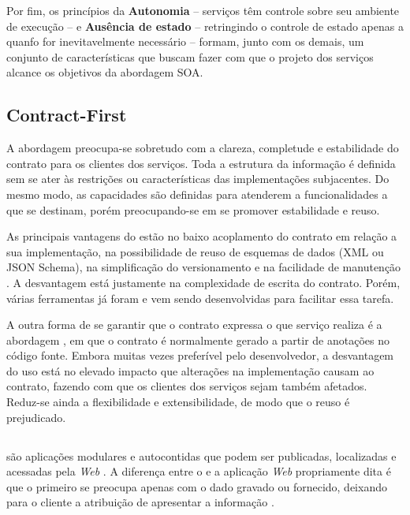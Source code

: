 Por fim, os princípios da \textbf{Autonomia} -- serviços têm controle sobre seu
ambiente de execução -- e \textbf{Ausência de estado} -- retringindo o controle
de estado apenas a quanfo for inevitavelmente necessário -- formam, junto com os
demais, um conjunto de características que buscam fazer com que o projeto dos serviços 
alcance os objetivos da abordagem SOA.

\subsection{Contract-First}

A abordagem \CtFirst{} preocupa-se sobretudo com a clareza, completude e
estabilidade do contrato para os clientes dos serviços. Toda a
estrutura da informação é definida sem se ater às restrições ou
características das implementações subjacentes. Do mesmo modo, as
capacidades são definidas para atenderem a funcionalidades a que se destinam,
porém preocupando-se em se promover estabilidade e reuso.

As principais vantagens do \CtFirst{} estão no baixo acoplamento do contrato em
relação a sua implementação, na possibilidade de reuso de esquemas de dados (XML
ou JSON Schema), na simplificação do versionamento e na facilidade de manutenção
\cite{karthikeyancontract}. A desvantagem está justamente na complexidade de
escrita do contrato. Porém, várias ferramentas já foram e vem sendo
desenvolvidas para facilitar essa tarefa.

A outra forma de se garantir que o contrato expressa o que serviço realiza é a
abordagem \CdFirst{}, em que o contrato é normalmente gerado a partir de
anotações no código fonte. Embora muitas vezes preferível pelo desenvolvedor, a desvantagem do uso
\CdFirst{} está no elevado impacto que alterações na implementação causam ao
contrato, fazendo com que os clientes dos serviços sejam também afetados.
Reduz-se ainda a flexibilidade e extensibilidade, de modo que o reuso é
prejudicado.

\subsection{\wss{}}

\ws{} são aplicações modulares e autocontidas que podem ser publicadas,
localizadas e acessadas pela \textit{Web} \cite{alonso2004web}. A diferença
entre o \ws{} e a aplicação \textit{Web} propriamente dita é que o primeiro se
preocupa apenas com o dado gravado ou fornecido, deixando para o cliente a atribuição de apresentar a
informação \cite{serrano2014service}.

